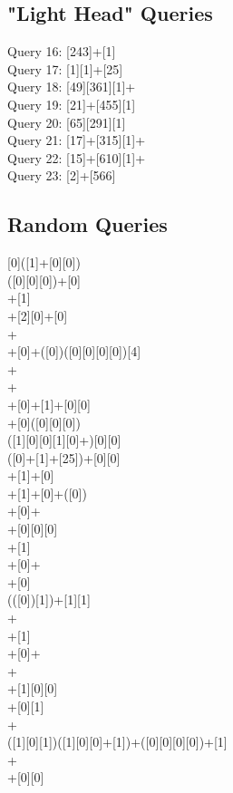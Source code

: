 \subsection{"Light Head" Queries}
Query 16: [243]+[1]
\\Query 17: [1][1]+[25]
\\Query 18: [49][361][1]+
\\Query 19: [21]+[455][1]
\\Query 20: [65][291][1]\*
\\Query 21: [17]+[315][1]+
\\Query 22: [15]+[610][1]+
\\Query 23: [2]+[566]
\subsection{Random Queries}
[0]\*([1]+[0][0])
\\([0][0][0])+[0]\*
\\\relax [0][0][0][1]\*[0]+[1]
\\\relax [0][0]+[2][0]\*[1]+[0]\*[1]\*
\\\relax [1]\*[0]+
\\\relax [1][0]\*[1]+[0]+([0]\*[1][1]\*)\*([0][0][0][0])[4]
\\\relax [0][0]\*[1][0]+
\\\relax [0][0]\*[1]+
\\\relax [0][1][0][0]\*[1]+[0]+[1]+[0][0]
\\\relax [1]+[0]([0][0][0])\*[0]\*[45]
\\\relax [0][0][0]([1][0][0][1][0]+)[0][0]\*
\\([0]+[1]+[25])+[0][0]\*
\\\relax [0]+[1]+[0]\*[1][0]\*[1]\*
\\\relax [0]+[1]+[0]+([0]\*[1][0][0])
\\\relax [1][0][0][0]\*[260]+[0]+
\\\relax [1][0]\*[1]+[0][0][0]
\\\relax [0][0]\*[1][0]+[1]\*[0][0]
\\\relax [0][0][1]\*[0]\*[1]+[0]+
\\\relax [1]\*[0][1]+[0]
\\(([0]\*[2][0])[1]\*[0][1])\*[0][0]+[1][1]
\\\relax [0]\*[1]\*[0]\*[1]+
\\\relax [1][0][1]\*[0][0]+[1]
\\\relax [0][0]\*[1]+[0]+
\\\relax [1][0][0]\*[1]+
\\\relax [0]+[1][0][0]\*[1][0]
\\\relax [1][0]\*[1]+[0][1]
\\\relax [56]\*[0][1]+
\\([1][0][1])([1][0][0]+[1])+([0][0][0][0])\*[0]+[1]
\\\relax [0][0][0]\*[1]+
\\\relax [0][0]\*[130]+[0][0]
